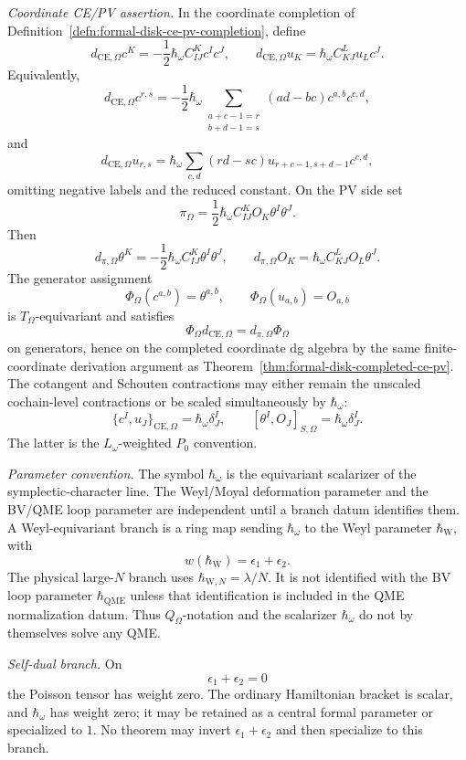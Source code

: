 \begin{stmt}
  \emph{Coordinate CE/PV assertion.} In the coordinate completion of
  Definition~\ref{defn:formal-disk-ce-pv-completion}, define
  \[
    d_{\mathrm{CE},\Omega}c^K
    =
    -\frac12\hbar_\omega C^K_{IJ}c^Ic^J,
    \qquad
    d_{\mathrm{CE},\Omega}u_K
    =
    \hbar_\omega C^L_{KJ}u_Lc^J.
  \]
  Equivalently,
  \[
    d_{\mathrm{CE},\Omega}c^{r,s}
    =
    -\frac12\hbar_\omega
    \sum_{\substack{a+c-1=r\\ b+d-1=s}}
    (ad-bc)c^{a,b}c^{c,d},
  \]
  and
  \[
    d_{\mathrm{CE},\Omega}u_{r,s}
    =
    \hbar_\omega
    \sum_{c,d}(rd-sc)
    u_{r+c-1,s+d-1}c^{c,d},
  \]
  omitting negative labels and the reduced constant.  On the PV side set
  \[
    \pi_\Omega
    =
    \frac12\hbar_\omega C^K_{IJ}O_K\theta^I\theta^J .
  \]
  Then
  \[
    d_{\pi,\Omega}\theta^K
    =
    -\frac12\hbar_\omega C^K_{IJ}\theta^I\theta^J,
    \qquad
    d_{\pi,\Omega}O_K
    =
    \hbar_\omega C^L_{KJ}O_L\theta^J.
  \]
  The generator assignment
  \[
    \Phi_\Omega(c^{a,b})=\theta^{a,b},\qquad
    \Phi_\Omega(u_{a,b})=O_{a,b}
  \]
  is \(T_\Omega\)-equivariant and satisfies
  \[
    \Phi_\Omega d_{\mathrm{CE},\Omega}
    =
    d_{\pi,\Omega}\Phi_\Omega
  \]
  on generators, hence on the completed coordinate dg algebra by the
  same finite-coordinate derivation argument as
  Theorem~\ref{thm:formal-disk-completed-ce-pv}.  The cotangent and
  Schouten contractions may either remain the unscaled cochain-level
  contractions or be scaled simultaneously by \(\hbar_\omega\):
  \[
    \{c^I,u_J\}_{\mathrm{CE},\Omega}
    =
    \hbar_\omega\delta^I_J,\qquad
    [\theta^I,O_J]_{S,\Omega}
    =
    \hbar_\omega\delta^I_J.
  \]
  The latter is the \(L_\omega\)-weighted \(P_0\) convention.

  \emph{Parameter convention.} The symbol \(\hbar_\omega\) is the
  equivariant scalarizer of the symplectic-character line.  The
  Weyl/Moyal deformation parameter and the BV/QME loop parameter are
  independent until a branch datum identifies them.  A Weyl-equivariant
  branch is a ring map sending \(\hbar_\omega\) to the Weyl parameter
  \(\hbar_{\mathrm{W}}\), with
  \[
    w(\hbar_{\mathrm{W}})=\epsilon_1+\epsilon_2 .
  \]
  The physical large-\(N\) branch uses
  \(\hbar_{\mathrm{W},N}=\lambda/N\).  It is not identified with the BV
  loop parameter \(\hbar_{\mathrm{QME}}\) unless that identification is
  included in the QME normalization datum.  Thus \(Q_\Omega\)-notation and
  the scalarizer \(\hbar_\omega\) do not by themselves solve any QME.

  \emph{Self-dual branch.} On
  \[
    \epsilon_1+\epsilon_2=0
  \]
  the Poisson tensor has weight zero.  The ordinary Hamiltonian bracket
  is scalar, and \(\hbar_\omega\) has weight zero; it may be retained as a
  central formal parameter or specialized to \(1\).  No theorem may
  invert \(\epsilon_1+\epsilon_2\) and then specialize to this branch.


\end{stmt}
